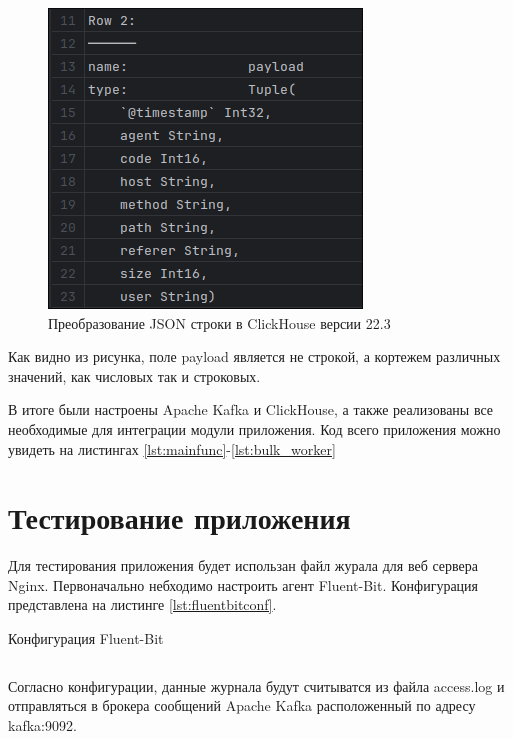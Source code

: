 \documentclass[14pt, russian]{scrartcl}
\begin{document}
\begin{figure}[H]
	\centering
	\begin{minipage}[t]{.7\textwidth}
		\centering
		\includegraphics[width=.6\textwidth]{./imgs/descres1.png}
	\end{minipage}
	\caption{Преобразование JSON строки в ClickHouse версии 22.3}
	\label{fig:descres}
\end{figure}

Как видно из рисунка, поле payload является не строкой,
а кортежем различных значений, как числовых так и строковых.


В итоге были настроены Apache Kafka и ClickHouse, а также
реализованы все необходимые для интеграции
модули приложения. Код всего приложения можно увидеть на листингах \ref{lst:mainfunc}-\ref{lst:bulk_worker}


\section{Тестирование приложения}

Для тестирования приложения будет
использан файл журала для веб сервера Nginx.
Первоначально небходимо настроить агент Fluent-Bit. Конфигурация 
представлена на листинге \ref{lst:fluentbitconf}.

\begin{listing}[H]
	\caption{Конфигурация Fluent-Bit}
	\label{lst:fluentbitconf}
	\inputminted[style=bw, frame=single,fontsize = \footnotesize, linenos=false, xleftmargin = 1.5em]{sql}{./listings/fluent-bit.conf}
\end{listing}

Согласно конфигурации, данные журнала будут
считыватся из файла access.log и отправляться в 
брокера сообщений Apache Kafka расположенный 
по адресу kafka:9092.
\end{document}
